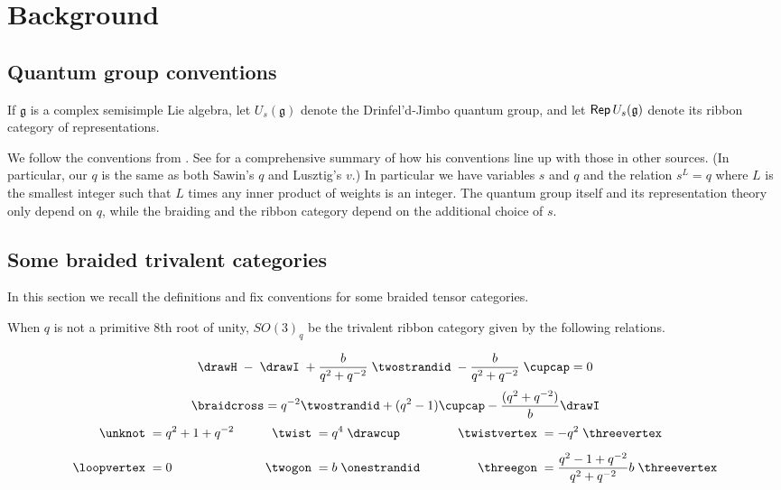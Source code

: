 \documentclass[12pt]{amsart}
\begin{document}
\section{Background}



\subsection{Quantum group conventions}

If $\mathfrak{g}$ is a complex semisimple Lie algebra, let $U_s(\mathfrak{g})$
denote the Drinfel'd-Jimbo quantum group, and let $\operatorname{\mathsf{Rep}}{U_s(\mathfrak{g})}$
denote its ribbon category of representations.

We follow the conventions from \cite{MR2286123}.  See \cite[p. 2]{MR2286123}
for a comprehensive summary of how his conventions line up with those in other
sources. (In particular, our $q$ is the same as both Sawin's $q$ and Lusztig's
$v$.) In particular we have variables $s$ and $q$ and the relation $s^L = q$
where $L$ is the smallest integer such that $L$ times any inner product of
weights is an integer. The quantum group itself and its representation theory
only depend on $q$, while the braiding and the ribbon category depend on the
additional choice of $s$.

\subsection{Some braided trivalent categories}

In this section we recall the definitions and fix conventions for some braided tensor categories.

\begin{definition}
When $q$ is not a primitive $8$th root of unity, $SO(3)_q$ be the trivalent ribbon category given by the following relations.

$$  \drawH \; - \; \drawI \; + \frac{b}{q^2+q^{-2}}\; \twostrandid \; -  \frac{b}{q^2+q^{-2}}\; \cupcap = 0$$
$$\braidcross  =  q^{-2} \twostrandid + (q^2 - 1) \cupcap - \frac{(q^2+q^{-2})}{b} \drawI$$
\begin{align*}
    \unknot\; &= q^2+1+q^{-2}&\qquad
      \twist\; &= q^4 \;\drawcup&\qquad
        \twistvertex\; &= -q^2\;\threevertex\\[5pt]
    \loopvertex\;&=0&
      \twogon\;&= b\;\onestrandid&
        \threegon\; &= \frac{q^2-1+q^{-2}}{q^2+q^{-2}} b\;\threevertex
\end{align*}
\end{definition}
\end{document}
